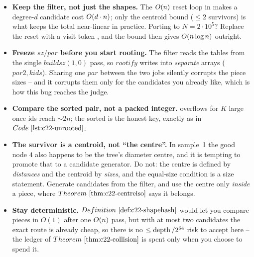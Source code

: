 \begin{hardeningbox}
\begin{itemize}[nosep,leftmargin=1.4em]
  \item \textbf{Keep the filter, not just the shapes.} The \(O(n)\) reset loop in
         makes a degree-\(d\) candidate cost \(O(d\cdot n)\); only the
        centroid bound (\(\le2\) survivors) is what keeps the total near-linear in practice.
        Porting to \(N=2\cdot10^5\)? Replace the reset with a visit token
        , and the bound then gives \(O(n\log n)\) outright.
  \item \textbf{Freeze \(\mathit{sz}/\mathit{par}\) before you start rooting.} The filter
        reads the tables from the single \(\mathit{buildsz}(1,0)\) pass, so
        \(\mathit{rootify}\) writes into \emph{separate} arrays
        (\(\mathit{par2},\mathit{kids}\)). Sharing one \(\mathit{par}\) between the two
        jobs silently corrupts the piece sizes -- and it corrupts them only for the
        candidates you already like, which is how this bug reaches the judge.
  \item \textbf{Compare the sorted pair, not a packed integer.}  overflows for \(K\) large once ids reach \(\sim\!2n\); the sorted
         is the honest key, exactly as in
        \(\coderef{c22-unrooted}\).
  \item \textbf{The survivor is a centroid, not ``the centre''.} In sample~1 the good node
        \(4\) also happens to be the tree's diameter centre, and it is tempting to promote
        that to a candidate generator. Do not: the centre is defined by \emph{distances} and
        the centroid by \emph{sizes}, and the equal-size condition is a size statement.
        Generate candidates from the filter, and use the centre only \emph{inside} a piece,
        where \(\thmref{c22-centreiso}\) says it belongs.
  \item \textbf{Stay deterministic.} \(\defref{c22-shapehash}\) would let you compare pieces
        in \(O(1)\) after one \(O(n)\) pass, but with at most two candidates the exact
        route is already cheap, so there is no \(\le\operatorname{depth}/2^{64}\) risk to accept here --
        the ledger of \(\thmref{c22-collision}\) is spent only when you choose to spend it.
\end{itemize}
\end{hardeningbox}

